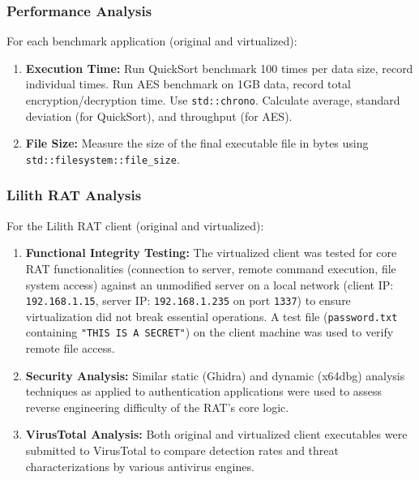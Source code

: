 \subsubsection{Performance Analysis}
For each benchmark application (original and virtualized):
    \begin{enumerate}
        \item \textbf{Execution Time:} Run QuickSort benchmark 100 times per data size, record individual times. Run AES benchmark on 1GB data, record total encryption/decryption time. Use \texttt{std::chrono}. Calculate average, standard deviation (for QuickSort), and throughput (for AES).
        \item \textbf{File Size:} Measure the size of the final executable file in bytes using \texttt{std::filesystem::file\_size}.
    \end{enumerate}

\subsubsection{Lilith RAT Analysis}
\label{subsubsec:methodology_lilith_rat_journal} 
For the Lilith RAT client (original and virtualized):
\begin{enumerate}
    \item \textbf{Functional Integrity Testing:} The virtualized client was tested for core RAT functionalities (connection to server, remote command execution, file system access) against an unmodified server on a local network (client IP: \texttt{192.168.1.15}, server IP: \texttt{192.168.1.235} on port \texttt{1337}) to ensure virtualization did not break essential operations. A test file (\texttt{password.txt} containing \texttt{"THIS IS A SECRET"}) on the client machine was used to verify remote file access.
    \item \textbf{Security Analysis:} Similar static (Ghidra) and dynamic (x64dbg) analysis techniques as applied to authentication applications were used to assess reverse engineering difficulty of the RAT's core logic.
    \item \textbf{VirusTotal Analysis:} Both original and virtualized client executables were submitted to VirusTotal to compare detection rates and threat characterizations by various antivirus engines.
\end{enumerate}

